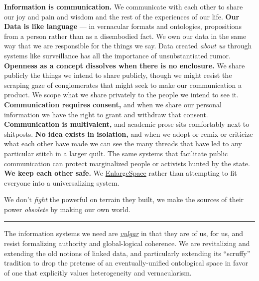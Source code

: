 \documentclass{article}
\begin{document}
\textbf{Information is communication.} We communicate with each other to
share our joy and pain and wisdom and the rest of the experiences of our
life. \textbf{Our Data is like language} --- in vernacular formats and
ontologies, propositions from a person rather than as a disembodied
fact. We own our data in the same way that we are responsible for the
things we say. Data created \emph{about us} through systems like
surveillance has all the importance of unsubstantiated rumor.
\textbf{Openness as a concept dissolves when there is no enclosure.} We
share publicly the things we intend to share publicly, though we might
resist the scraping gaze of conglomerates that might seek to make our
communication a product. We scope what we share privately to the people
we intend to see it. \textbf{Communication requires consent,} and when
we share our personal information we have the right to grant and
withdraw that consent. \textbf{Communication is multivalent,} and
academic prose sits comfortably next to shitposts. \textbf{No idea
exists in isolation,} and when we adopt or remix or criticize what each
other have made we can see the many threads that have led to any
particular stitch in a larger quilt. The same systems that facilitate
public communication can protect marginalized people or activists hunted
by the state. \textbf{We keep each other safe.} We
\href{http://meatballwiki.org/wiki/EnlargeSpace}{EnlargeSpace} \cite{MeatballWikiEnlargeSpace}  rather than attempting to fit everyone
into a universalizing system.

We don't \emph{fight} the powerful on terrain they built, we make the
sources of their power \emph{obsolete} by making our own world.

\begin{center}\rule{0.5\linewidth}{0.5pt}\end{center}

The information systems we need are
\href{https://www.etymonline.com/search?q=vulgar}{\emph{vulgar}} \cite{harperVulgar}  in that they are of us, for us, and resist
formalizing authority and global-logical coherence. We are revitalizing
and extending the old notions of linked data, and particularly extending
its ``scruffy'' tradition \cite{poirierTurnScruffyEthnographic2017}  to drop the pretense of an eventually-unified ontological space in
favor of one that explicitly values heterogeneity and vernacularism.
\end{document}
